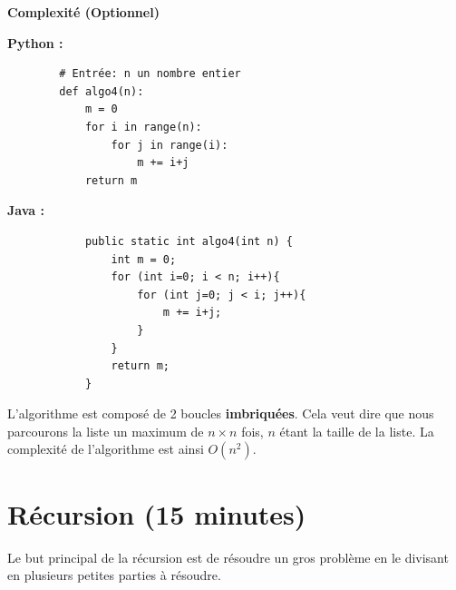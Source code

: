 \begin{Exercice}[10 minutes] \textbf{Complexité (Optionnel)} \\        
        \item \textbf{Python :}
        \begin{verbatim}
        # Entrée: n un nombre entier
        def algo4(n):
            m = 0
            for i in range(n):
                for j in range(i):
                    m += i+j
            return m
        \end{verbatim}
        
        \textbf{Java :}
        \begin{verbatim}
            public static int algo4(int n) {
                int m = 0;
                for (int i=0; i < n; i++){
                    for (int j=0; j < i; j++){
                        m += i+j;
                    }
                }
                return m;
            }
        \end{verbatim}
    \begin{solution} 
    L'algorithme est composé de 2 boucles \textbf{imbriquées}. Cela veut dire que nous parcourons la liste un maximum de $n \times n$ fois, $n$ étant la taille de la liste. La complexité de l'algorithme est ainsi $O(n^2)$.
    \end{solution}
    
\end{Exercice}
    
        
\section{Récursion (15 minutes)}

Le but principal de la récursion est de résoudre un gros problème en le divisant en plusieurs petites parties à résoudre.

